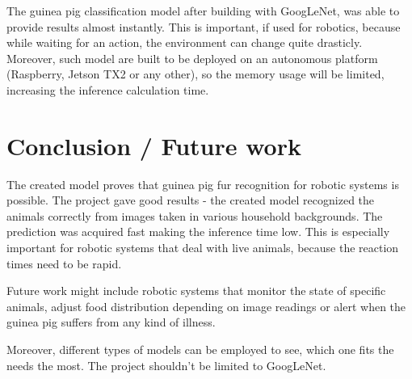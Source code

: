 \documentclass[10pt,journal,compsoc]{IEEEtran}
\begin{document}
    The guinea pig classification model after building with GoogLeNet, was able to provide results almost instantly. This is important, if used for robotics, because while waiting for an action, the environment can change quite drasticly. Moreover, such model are built to be deployed on an autonomous platform (Raspberry, Jetson TX2 or any other), so the memory usage will be limited, increasing the inference calculation time.
    
    \section{Conclusion / Future work}
    The created model proves that guinea pig fur recognition for robotic systems is possible. The project gave good results - the created model recognized the animals correctly from images taken in various household backgrounds. The prediction was acquired fast making the inference time low. This is especially important for robotic systems that deal with live animals, because the reaction times need to be rapid. 

    Future work might include robotic systems that monitor the state of specific animals, adjust food distribution depending on image readings or alert when the guinea pig suffers from any kind of illness.

    Moreover, different types of models can be employed to see, which one fits the needs the most. The project shouldn't be limited to GoogLeNet.
    
   
   
    
    
\end{document}
